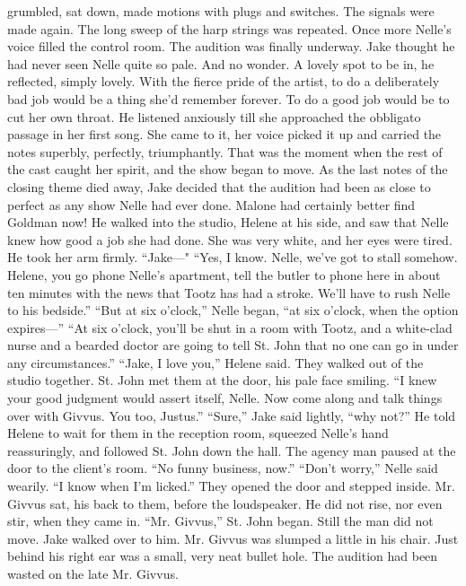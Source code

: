 \documentclass{novel}
\begin{document}
grumbled, sat down, made motions with plugs and switches. The signals were made again. The long sweep of the harp strings was repeated. Once more Nelle’s voice filled the control room. The audition was finally underway. Jake thought he had never seen Nelle quite so pale. And no wonder. A lovely spot to be in, he reflected, simply lovely. With the fierce pride of the artist, to do a deliberately bad job would be a thing she’d remember forever. To do a good job would be to cut her own throat. He listened anxiously till she approached the obbligato passage in her first song. She came to it, her voice picked it up and carried the notes superbly, perfectly, triumphantly. That was the moment when the rest of the cast caught her spirit, and the show began to move. As the last notes of the closing theme died away, Jake decided that the audition had been as close to perfect as any show Nelle had ever done. Malone had certainly better find Goldman now! He walked into the studio, Helene at his side, and saw that Nelle knew how good a job she had done. She was very white, and her eyes were tired. He took her arm firmly. “Jake—" “Yes, I know. Nelle, we’ve got to stall somehow. Helene, you go phone Nelle’s apartment, tell the butler to phone here in about ten minutes with the news that Tootz has had a stroke. We’ll have to rush Nelle to his bedside.” “But at six o’clock,” Nelle began, “at six o’clock, when the option expires—” “At six o’clock, you’ll be shut in a room with Tootz, and a white-clad nurse and a bearded doctor are going to tell St. John that no one can go in under any circumstances.” “Jake, I love you,” Helene said. They walked out of the studio together. St. John met them at the door, his pale face smiling. “I knew your good judgment would assert itself, Nelle. Now come along and talk things over with Givvus. You too, Justus.” “Sure,” Jake said lightly, “why not?” He told Helene to wait for them in the reception room, squeezed Nelle’s hand reassuringly, and followed St. John down the hall. The agency man paused at the door to the client’s room. “No funny business, now.” “Don’t worry,” Nelle said wearily. “I know when I’m licked.” They opened the door and stepped inside. Mr. Givvus sat, his back to them, before the loudspeaker. He did not rise, nor even stir, when they came in. “Mr. Givvus,” St. John began. Still the man did not move. Jake walked over to him. Mr. Givvus was slumped a little in his chair. Just behind his right ear was a small, very neat bullet hole. The audition had been wasted on the late Mr. Givvus.
\end{document}
